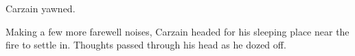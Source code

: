 % 
% 
% 
% 
% 
% 
% 


Carzain yawned. 


Making a few more farewell noises, Carzain headed for his sleeping place near the fire to settle in. Thoughts passed through his head as he dozed off.

